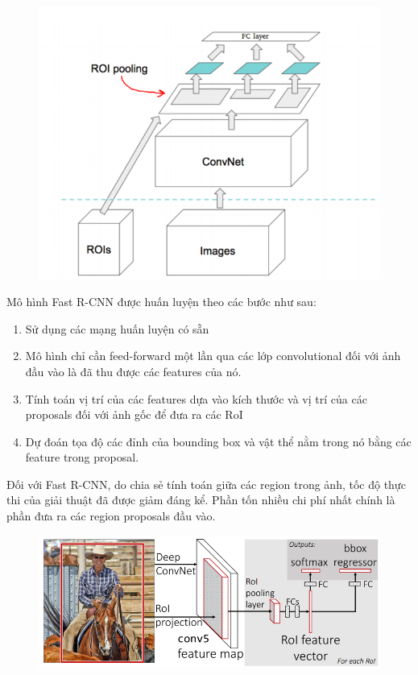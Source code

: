 \begin{center}
    \begin{figure}[H]
    \centering
    \includegraphics[width=0.6\columnwidth]{images/chap2/RoiPoolingLayer.png}
    \label{chap2:2.34}
    \end{figure}
\end{center}

Mô hình Fast R-CNN được huấn luyện theo các bước như sau:
\begin{enumerate}
    \item Sử dụng các mạng huấn luyện có sẵn
    \item Mô hình chỉ cần feed-forward một lần qua các lớp convolutional đối với ảnh đầu vào là đã thu được các features của nó.
    \item Tính toán vị trí của các features dựa vào kích thước và vị trí của các proposals đối với ảnh gốc để đưa ra các RoI 
    \item Dự đoán tọa độ các đỉnh của bounding box và vật thể nằm trong nó bằng các feature trong proposal.
\end{enumerate}

Đối với Fast R-CNN, do chia sẻ tính toán giữa các region trong ảnh, tốc độ thực thi của giải thuật đã được giảm đáng kể. Phần tốn nhiều chi phí nhất chính là phần đưa ra các region proposals đầu vào.

\begin{center}
    \begin{figure}[htp]
    \centering
    \includegraphics[width=0.5\columnwidth]{images/chap2/Fast_RCNN.png}
    \label{fig:2.35}
    \end{figure}
\end{center}
